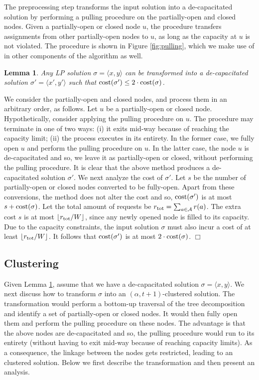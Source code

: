 \documentclass[11pt]{article}
\newtheorem{lemma}[theorem]{Lemma}
\newcommand{\rtot} {r_{\rm tot}}
\newcommand{\calA} {{\cal A}}
\newcommand{\pair}[2] {\langle #1, #2\rangle}
\newcommand{\cost} {{\rm cost}}
\newcommand{\qed} {\hfill$\Box$}
\begin{document}
The preprocessing step transforms the input solution into a 
de-capacitated solution by performing a pulling procedure on the partially-open and closed nodes.
Given a partially-open or closed node $u$, the procedure transfers assignments from other partially-open nodes
to $u$, as long as the capacity at $u$ is not violated. The procedure is shown in Figure \ref{fig:pulling},
which we make use of in other components of the algorithm as well.

\begin{lemma}
\label{lem:de-capacitation}
Any LP solution $\sigma = \pair{x}{y}$ can be transformed into a de-capacitated solution $\sigma'=\pair{x'}{y'}$
such that 
$\cost(\sigma') \leq 2\cdot \cost(\sigma)$. 
\end{lemma}
\proof
We consider the partially-open and closed nodes, and process them in an arbitrary order, as follows.
Let $u$ be a partially-open or closed node. Hypothetically, consider applying the pulling procedure on $u$. 
The procedure may terminate in one of two ways: 
(i) it exits mid-way because of reaching the capacity limit;
(ii) the process executes in its entirety.
In the former case, we fully open $u$ and perform the pulling procedure on $u$.
In the latter case, the node $u$ is de-capacitated
and so, we leave it as partially-open or closed, without performing the pulling procedure.
It is clear that the above method produces a de-capacitated solution $\sigma'$.
We next analyze the cost of $\sigma'$. Let $s$ be the number of partially-open or closed nodes
converted to be fully-open. Apart from these conversions, the method does not alter the cost 
and so, $\cost(\sigma')$ is at most $s+\cost(\sigma)$.
Let the total amount of requests be $\rtot=\sum_{a\in \calA}r(a)$.
The extra cost $s$ is at most $\lfloor \rtot/W \rfloor$,
since any newly opened node is filled to its capacity.
Due to the capacity constraints, the input solution $\sigma$ must also incur a cost of at least $\lfloor \rtot/W\rfloor$.
It follows that $\cost(\sigma')$ is at most $2\cdot \cost(\sigma)$.
\qed

\subsection{Clustering}
Given Lemma \ref{lem:de-capacitation}, assume that we have a de-capacitated solution $\sigma=\pair{x}{y}$.
We next discuss how to transform $\sigma$ into an $(\alpha, t+1)$-clustered solution.
The transformation would perform a bottom-up traversal of the tree decomposition and identify a set of partially-open or closed nodes.
It would then fully open them and perform the pulling procedure on these nodes.
The advantage is that the above nodes are de-capacitated and 
so, the pulling procedure would run to its entirety (without having to exit mid-way because of reaching capacity limits).
As a consequence, the linkage between the nodes gets restricted, leading to an clustered solution.
Below we first describe the transformation and then present an analysis.
\end{document}
